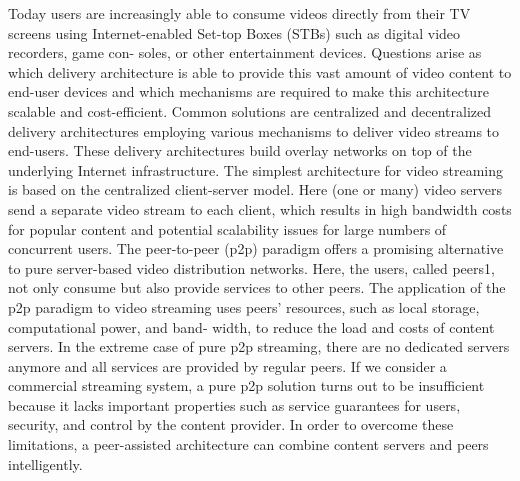 Today users are increasingly able to consume videos directly from their TV screens using Internet-enabled Set-top Boxes (STBs) such as digital video recorders, game con- soles, or other entertainment devices. 
Questions arise as which delivery architecture is able to provide this vast amount of video content to end-user devices and which mechanisms are required to make this architecture scalable and cost-efficient. 
Common solutions are centralized and decentralized delivery architectures employing various mechanisms to deliver video streams to end-users. 
These delivery architectures build overlay networks on top of the underlying Internet infrastructure.
The simplest architecture for video streaming is based on the centralized client-server model. Here (one or many) video servers send a separate video stream to each client, which results in high bandwidth costs for popular content and potential scalability issues for large numbers of concurrent users. 
The peer-to-peer (p2p) paradigm offers a promising alternative to pure server-based video distribution networks. 
Here, the users, called peers1, not only consume but also provide services to other peers. The application of the p2p paradigm to video streaming uses peers’ resources, such as local storage, computational power, and band- width, to reduce the load and costs of content servers. In the extreme case of pure p2p streaming, there are no dedicated servers anymore and all services are provided by regular peers.
If we consider a commercial streaming system, a pure p2p solution turns out to be insufficient because it lacks important properties such as service guarantees for users, security, and control by the content provider. 
In order to overcome these limitations, a peer-assisted architecture can combine content servers and peers intelligently.

